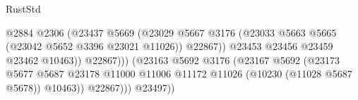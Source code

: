 \begin{lexlean}{RustStd}
\begin{coremodule}
                                                            @2884
                                                            @2306
                                                            (@23437
                                                              @5669
                                                              (@23029
                                                                @5667
                                                                @3176
                                                                (@23033
                                                                  @5663
                                                                  @5665
                                                                  (@23042
                                                                    @5652
                                                                    @3396
                                                                    @23021
                                                                    @11026))
                                                                @22867))
                                                            @23453
                                                            @23456
                                                            @23459
                                                            @23462
                                                            @10463))
                                                        @22867)))
                                                  (@23163
                                                    @5692
                                                    @3176
                                                    (@23167
                                                      @5692
                                                      (@23173
                                                        @5677
                                                        @5687
                                                        @23178
                                                        @11000
                                                        @11006
                                                        @11172
                                                        @11026
                                                        (@10230 (@11028 @5687 @5678))
                                                        @10463))
                                                    @22867)))
                                              @23497))

\end{coremodule}
\end{lexlean}
